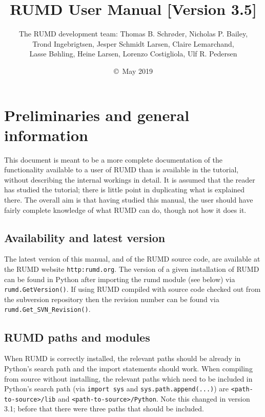 \documentclass[a4paper]{article}
\title{RUMD User Manual [Version 3.5]}
\begin{document}
\author{The RUMD development team: Thomas B. Schr{\o}der, Nicholas P. Bailey,\\
 Trond Ingebrigtsen, Jesper Schmidt Larsen, Claire Lemarchand, \\
Lasse B{\o}hling, Heine Larsen, Lorenzo Costigliola, Ulf R. Pedersen}

\date{\copyright\ May 2019}


\maketitle

\tableofcontents

\section{Preliminaries and general information}

This document is meant to be a more complete documentation of the functionality
available to a user of RUMD than is available in the tutorial, 
without describing the internal workings in detail. It is assumed that the
reader has studied the tutorial; there is little point in duplicating what is
explained there. The overall aim is that having studied this manual, the user
should have fairly complete knowledge of what RUMD can do, though not how it
does it.

\subsection{Availability and latest version}

The latest version of this manual, and of the RUMD source code, are available 
at the RUMD website \verb|http:rumd.org|. The version of a given installation
of RUMD can be found in Python after importing the rumd module (see below)
via \verb|rumd.GetVersion()|. If using RUMD compiled
with source code checked out from the
subversion repository then the revision number can be found via
\verb|rumd.Get_SVN_Revision()|.

\subsection{RUMD paths and modules}

When RUMD is correctly installed, the relevant paths should be already in
Python's search path and the import statements should work. When compiling from
source without installing, the relevant paths which need to be included in
Python's search path (via \verb|import sys| and \verb|sys.path.append(...)|)
are \verb|<path-to-source>/lib| and
\verb|<path-to-source>/Python|. Note this changed in version 3.1; before that there were three paths that should be included.
\end{document}
